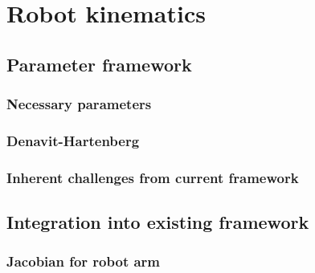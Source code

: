 \chapter{Robot kinematics}

\section{Parameter framework}
\lipsum[1]
\subsection{Necessary parameters}
\subsection{Denavit-Hartenberg}
\subsection{Inherent challenges from current framework}

\section{Integration into existing framework}
\lipsum[1]
\subsection{Jacobian for robot arm}